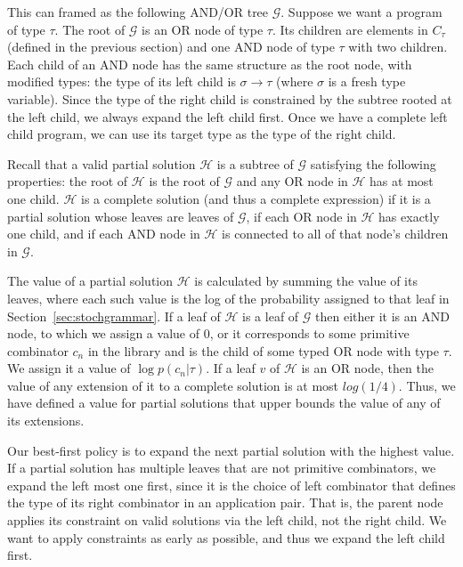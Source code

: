 \documentclass{article}
\begin{document}
This can framed as the following AND/OR tree $\mathcal{G}$. Suppose we
want a program of type $\tau$. The root of $\mathcal{G}$ is an OR node of
type $\tau$. Its children are elements in $C_\tau$ (defined in the previous
section) and one AND node of type $\tau$ with two children. Each child of
an AND node has the same structure as the root node, with modified
types: the type of its left child is $\sigma \rightarrow \tau$ (where $\sigma$ is
a fresh type variable). Since the type of the right child is
constrained by the subtree rooted at the left child, we always expand
the left child first. Once we have a complete left child program, we
can use its target type as the type of the right child.

Recall that a valid partial solution $\mathcal{H}$ is a subtree of
$\mathcal{G}$ satisfying the following properties: the root of
$\mathcal{H}$ is the root of $\mathcal{G}$ and any OR node in
$\mathcal{H}$ has at most one child. $\mathcal{H}$ is a complete
solution (and thus a complete expression) if it is a partial solution
whose leaves are leaves of $\mathcal{G}$, if each OR node in
$\mathcal{H}$ has exactly one child, and if each AND node in
$\mathcal{H}$ is connected to all of that node's children in
$\mathcal{G}$.

The value of a partial solution $\mathcal{H}$ is calculated by summing
the value of its leaves, where each such value is the log of the
probability assigned to that leaf in
Section~\ref{sec:stochgrammar}. If a leaf of $\mathcal{H}$ is a leaf
of $\mathcal{G}$ then either it is an AND node, to which we assign a
value of 0, or it corresponds to some primitive combinator $c_n$ in
the library and is the child of some typed OR node with type $\tau$. We
assign it a value of $\log{p(c_n | \tau)}$. If a leaf $v$ of
$\mathcal{H}$ is an OR node, then the value of any extension of it to
a complete solution is at most $log(1/4)$. Thus, we have defined a
value for partial solutions that upper bounds the value of any of its
extensions.

Our best-first policy is to expand the next partial solution with the
highest value. If a partial solution has multiple leaves that are not
primitive combinators, we expand the left most one first, since it is
the choice of left combinator that defines the type of its right
combinator in an application pair. That is, the parent node applies
its constraint on valid solutions via the left child, not the right
child. We want to apply constraints as early as possible, and thus we
expand the left child first.
\end{document}
